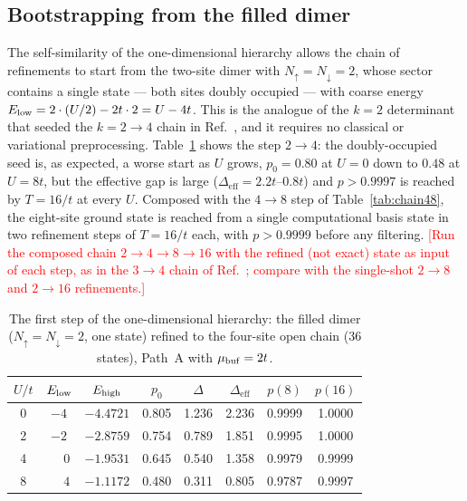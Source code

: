 \documentclass[
  aps,
  prc,
  reprint,
  superscriptaddress,
  floatfix,
  nofootinbib
]{revtex4-2}
\newcommand{\todo}[1]{\textcolor{red}{[#1]}}
\newcommand{\Deff}{\Delta_{\mathrm{eff}}}
\begin{document}
\subsection{Bootstrapping from the filled dimer}
\label{sec:dimer}
The self-similarity of the one-dimensional hierarchy allows the chain of
refinements to start from the two-site dimer with $N_\uparrow=N_\downarrow=2$,
whose sector contains a single state --- both sites doubly occupied ---
with coarse energy $E_{\rm low}=2\cdot(U/2)-2t\cdot2=U-4t$.  This is the
analogue of the $k=2$ determinant that seeded the $k=2\to4$ chain in
Ref.~\cite{EigenQPairing2026}, and it requires no classical or variational
preprocessing.  Table~\ref{tab:dimer} shows the step $2\to4$: the
doubly-occupied seed is, as expected, a worse start as $U$ grows,
$p_0=0.80$ at $U=0$ down to $0.48$ at $U=8t$, but the effective gap is
large ($\Deff=2.2t$--$0.8t$) and $p>0.9997$ is reached by $T=16/t$ at every
$U$.  Composed with the $4\to8$ step of Table~\ref{tab:chain48}, the
eight-site ground state is reached from a single computational basis
state in two refinement steps of $T=16/t$ each, with $p>0.9999$ before any
filtering.  \todo{Run the composed chain $2\to4\to8\to16$ with the refined
(not exact) state as input of each step, as in the $3\to4$ chain of
Ref.~\cite{EigenQPairing2026}; compare with the single-shot $2\to8$ and
$2\to16$ refinements.}

\begin{table}[t]
  \caption{The first step of the one-dimensional hierarchy: the filled dimer
  ($N_\uparrow=N_\downarrow=2$, one state) refined to the four-site open chain
  (36 states), Path~A with $\mu_{\rm buf}=2t$.}
  \label{tab:dimer}
  \begin{ruledtabular}
  \begin{tabular}{cccccccc}
  $U/t$ & $E_{\rm low}$ & $E_{\rm high}$ & $p_0$ & $\Delta$ & $\Deff$ & $p(8)$ & $p(16)$\\
  \hline
  0 & $-4$ & $-4.4721$ & 0.805 & 1.236 & 2.236 & 0.9999 & 1.0000\\
  2 & $-2$ & $-2.8759$ & 0.754 & 0.789 & 1.851 & 0.9995 & 1.0000\\
  4 & $\phantom{-}0$ & $-1.9531$ & 0.645 & 0.540 & 1.358 & 0.9979 & 0.9999\\
  8 & $\phantom{-}4$ & $-1.1172$ & 0.480 & 0.311 & 0.805 & 0.9787 & 0.9997\\
  \end{tabular}
  \end{ruledtabular}
\end{table}
\end{document}
